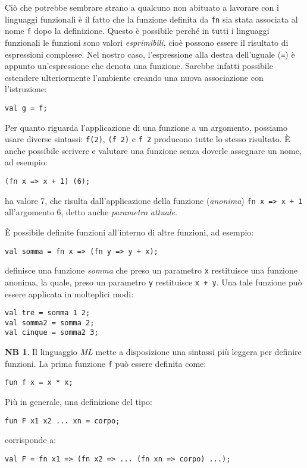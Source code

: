 \documentclass[12pt, a4paper]{report}
\theoremstyle{definition}
\newtheorem*{note}{NB}
\newcommand{\code}[1]{\texttt{#1}}
\begin{document}
Ciò che potrebbe sembrare strano a qualcuno non abituato a lavorare con i linguaggi
funzionali è il fatto che la funzione definita da \code{fn} sia stata associata al
nome \code{f} dopo la definizione. Questo è possibile perché in tutti i linguaggi
funzionali le funzioni sono valori \emph{esprimibili}, cioè possono essere il
risultato di espressioni complesse. Nel nostro caso, l'espressione alla destra
dell'uguale (\code{=}) è appunto un'espressione che denota una funzione.
Sarebbe infatti possibile estendere ulteriormente l'ambiente creando una nuova
associazione con l'istruzione:
\begin{lstlisting}[breaklines]
val g = f;
\end{lstlisting}

Per quanto riguarda l'applicazione di una funzione a un argomento, possiamo usare
diverse sintassi: \code{f(2)}, \code{(f 2)} e \code{f 2} producono tutte lo stesso
risultato. È anche possibile scrivere e valutare una funzione senza doverle
assegnare un nome, ad esempio:
\begin{lstlisting}
(fn x => x + 1) (6);
\end{lstlisting}
ha valore 7, che risulta dall'applicazione della funzione (\emph{anonima})
\code{fn x => x + 1} all'argomento 6, detto anche \emph{parametro attuale}.

È possibile definite funzioni all'interno di altre funzioni, ad esempio:
\begin{lstlisting}[breaklines]
val somma = fn x => (fn y => y + x);
\end{lstlisting}
definisce una funzione \emph{somma} che preso un parametro \code{x} restituisce
una funzione anonima, la quale, preso un parametro \code{y} restituisce \code{x + y}.
Una tale funzione può essere applicata in molteplici modi:
\begin{lstlisting}[breaklines]
val tre = somma 1 2;
val somma2 = somma 2;
val cinque = somma2 3;
\end{lstlisting}

\begin{note}
    Il linguaggio \emph{ML} mette a disposizione una sintassi più leggera per
    definire funzioni. La prima funzione \code{f} può essere definita come:
    \begin{lstlisting}
fun f x = x * x;
    \end{lstlisting}
    Più in generale, una definizione del tipo:
    \begin{lstlisting}
fun F x1 x2 ... xn = corpo;
    \end{lstlisting}
    corrisponde a:
    \begin{lstlisting}
val F = fn x1 => (fn x2 => ... (fn xn => corpo) ...);
    \end{lstlisting}
\end{note}
\end{document}
